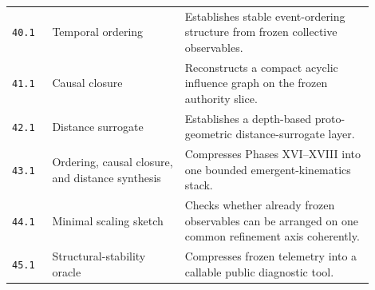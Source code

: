 \documentclass[11pt]{article}
\begin{document}
\begin{longtable}{p{0.10\linewidth}p{0.33\linewidth}p{0.47\linewidth}}
\texttt{40.1} & Temporal ordering & Establishes stable event-ordering structure from frozen collective observables. \\
\texttt{41.1} & Causal closure & Reconstructs a compact acyclic influence graph on the frozen authority slice. \\
\texttt{42.1} & Distance surrogate & Establishes a depth-based proto-geometric distance-surrogate layer. \\
\texttt{43.1} & Ordering, causal closure, and distance synthesis & Compresses Phases XVI--XVIII into one bounded emergent-kinematics stack. \\
\texttt{44.1} & Minimal scaling sketch & Checks whether already frozen observables can be arranged on one common refinement axis coherently. \\
\texttt{45.1} & Structural-stability oracle & Compresses frozen telemetry into a callable public diagnostic tool. \\
\end{longtable}

\normalsize
\end{document}
